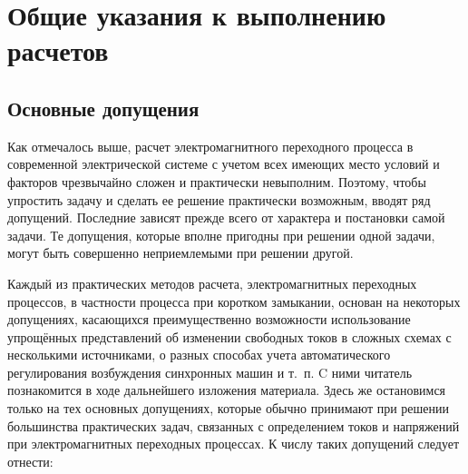 \chapter{Общие указания к выполнению расчетов}
\label{chap:2}

\section{Основные допущения}
\label{sec:2-1}

Как отмечалось выше, расчет электромагнитного переходного процесса в современной электрической системе с учетом всех имеющих место условий и факторов чрезвычайно сложен и практически невыполним. Поэтому, чтобы упростить задачу и сделать ее решение практически возможным, вводят ряд допущений. Последние зависят прежде всего от характера и постановки самой задачи. Те допущения, которые вполне пригодны при решении одной задачи, могут быть совершенно неприемлемыми при решении другой.

Каждый из практических методов расчета, электромагнитных переходных процессов, в частности процесса при коротком замыкании, основан на некоторых допущениях, касающихся преимущественно возможности использование упрощённых представлений об изменении свободных токов в сложных схемах с несколькими источниками, о разных способах учета автоматического регулирования возбуждения синхронных машин и т.~п. C ними читатель познакомится в ходе дальнейшего изложения материала. Здесь же остановимся только на тех основных допущениях, которые обычно принимают при решении большинства практических задач, связанных с определением токов и напряжений при электромагнитных переходных процессах. К  числу таких допущений следует отнести:


